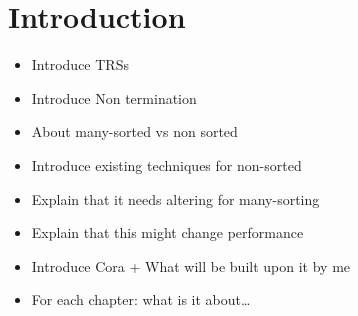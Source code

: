 \chapter{Introduction}\label{introduction}
\begin{itemize}
    \item Introduce TRSs
    \item Introduce Non termination
    \item About many-sorted vs non sorted 
    \item Introduce existing techniques for non-sorted
    \item Explain that it needs altering for many-sorting
    \item Explain that this might change performance
    \item Introduce Cora + What will be built upon it by me
    \item For each chapter: what is it about\dots
\end{itemize}
